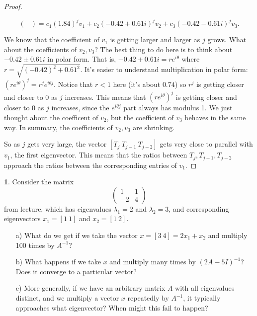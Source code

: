 \documentclass{article}
\theoremstyle{definition}
\newtheorem{prob}{}
\begin{document}
\begin{proof}
\begin{itemize}
\[\begin{pmatrix}
\end{pmatrix}= c_1 (1.84)^j v_1 + c_2 (-0.42+ 0.61 i)^j v_2 + c_3 (-0.42 - 0.61 i)^j v_3.\]
	\end{itemize}
We know that the coefficient of $v_1$ is getting larger and larger as $j$ grows. What about the coefficients of $v_2, v_3$? The best thing to do here is to think about $-0.42\pm 0.61 i$ in polar form. That is, $-0.42+ 0.61 i= r e^{i \theta}$ where $r= \sqrt{(-0.42)^2 + 0.61^2}$. It's easier to understand multiplication in polar form: $(re^{i \theta})^j=r^j e^{i \theta j}$. Notice that $r < 1$ here (it's about $0.74$) so $r^j$ is getting closer and closer to 0 as $j$ increases. This means that $(re^{i \theta})^j$ is getting closer and closer to $0$ as $j$ increases, since the $e^{i \theta j}$ part always has modulus 1. We just thought about the coefficent of $v_2$, but the coefficient of $v_3$ behaves in the same way. In summary, the coefficients of $v_2, v_3$ are shrinking. 

So as $j$ gets very large, the vector $[T_j \ T_{j-1} \ T_{j-2}]$ gets very close to parallel with $v_1$, the first eigenvector. This means that the ratios between $T_j, T_{j-1}, T_{j-2}$ approach the ratios between the corresponding entries of $v_1$.
\end{proof}

\begin{prob}
	Consider the matrix 
	\[\begin{pmatrix}
		1 & 1\\ -2 & 4
	\end{pmatrix}\]
from lecture, which has eigenvalues $\lambda_1=2$ and $\lambda_2=3$, and corresponding eigenvectors $x_1=[1 \ 1]$ and $x_2=[1\ 2]$.
\begin{itemize}
	\item[a)] What do we get if we take the vector $x= [3 \ 4]= 2x_1 + x_2$ and multiply 100 times by $A^{-1}$?
	\item[b)] What happens if we take $x$ and multiply many times by $(2A-5I)^{-1}$? Does it converge to a particular vector?
	\item[c)] More generally, if we have an arbitrary matrix $A$ with all eigenvalues distinct, and we multiply a vector $x$ repeatedly by $A^{-1}$, it typically approaches what eigenvector? When might this fail to happen?
\end{itemize}
\end{prob}
\end{document}
